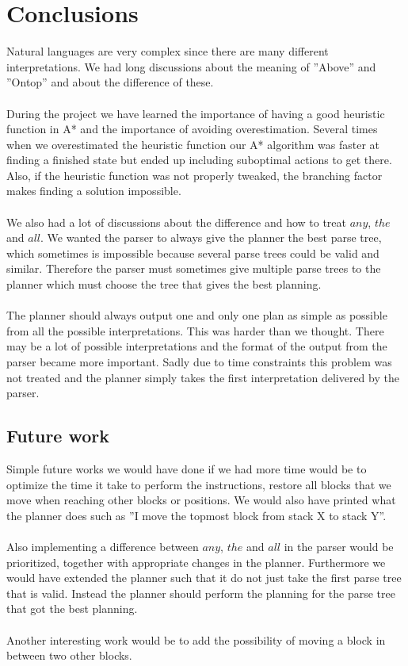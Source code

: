 \chapter{Conclusions}
Natural languages are very complex since there are many different
interpretations. We had long discussions about the meaning of ''Above'' and
''Ontop'' and about the difference of these.  
\\\\
During the project we have learned the importance of having a good heuristic
function in A* and the importance of avoiding overestimation. Several times
when we overestimated the heuristic function our A* algorithm was faster at
finding a finished state but ended up including suboptimal actions to get there. 
Also, if the heuristic function was not properly tweaked, the branching factor
makes finding a solution impossible.
\\\\
We also had a lot of discussions about the difference and how to treat $any$,
$the$ and $all$. We wanted the parser to always give the planner the best parse
tree, which sometimes is impossible because several parse trees could be valid
and similar. Therefore the parser must sometimes give multiple parse trees to
the planner which must choose the tree that gives the best planning.
\\\\
The planner should always output one and only one plan as simple as possible
from all the possible interpretations. This was harder than we thought.  There
may be a lot of possible interpretations and the format of the output from the
parser became more important. Sadly due to time constraints this problem was not
treated and the planner simply takes the first interpretation delivered by the
parser. 

\newpage 

\section{Future work}
Simple future works we would have done if we had more time would be to optimize
the time it take to perform the instructions, restore all blocks that we move
when reaching other blocks or positions. We would also have printed what the
planner does such as ''I move the topmost block from stack X to stack Y''.
\\\\
Also implementing a difference between $any$, $the$ and $all$ in the parser
would be prioritized, together with appropriate changes in the planner.
Furthermore we would have extended the planner such that it do not just take the
first parse tree that is valid. Instead the planner should perform the planning
for the parse tree that got the best planning. 
\\\\
Another interesting work would be to add the possibility of moving a block
in between two other blocks. 
